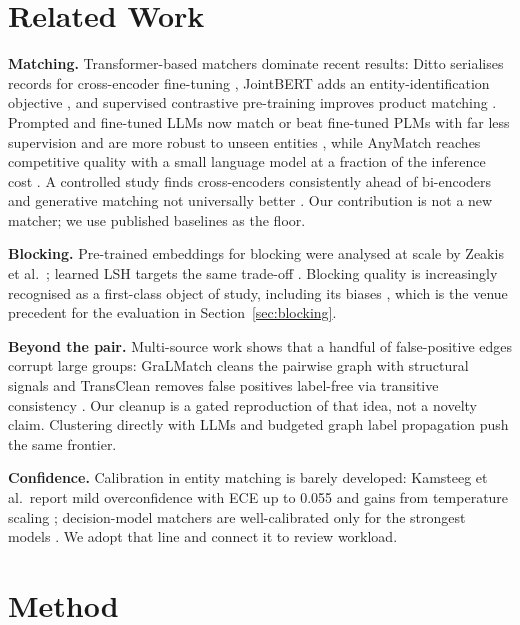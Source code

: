 \documentclass[conference]{IEEEtran}
\begin{document}
\section{Related Work}
\textbf{Matching.} Transformer-based matchers dominate recent results: Ditto serialises records for
cross-encoder fine-tuning \cite{li2020ditto}, JointBERT adds an entity-identification objective \cite{peeters2021jointbert}, and
supervised contrastive pre-training improves product matching \cite{peeters2022supcon}. Prompted and
fine-tuned LLMs now match or beat fine-tuned PLMs with far less supervision and are more robust to unseen
entities \cite{peeters2023llm,steiner2025finetune}, while AnyMatch reaches competitive quality with a
small language model at a fraction of the inference cost \cite{zhang2024anymatch}. A controlled study finds
cross-encoders consistently ahead of bi-encoders and generative matching not universally better
\cite{zhang2026beyond}. Our contribution is not a new matcher; we use published baselines as the floor.

\textbf{Blocking.} Pre-trained embeddings for blocking were analysed at scale by Zeakis et al.\
\cite{zeakis2023embeddings}; learned LSH targets the same trade-off \cite{wang2024nlsh}. Blocking quality is
increasingly recognised as a first-class object of study, including its biases \cite{moslemi2024blocking},
which is the venue precedent for the evaluation in Section~\ref{sec:blocking}.

\textbf{Beyond the pair.} Multi-source work shows that a handful of false-positive edges corrupt large
groups: GraLMatch cleans the pairwise graph with structural signals \cite{dmeer2025gralmatch} and
TransClean removes false positives label-free via transitive consistency \cite{dmeer2025transclean}. Our
cleanup is a gated reproduction of that idea, not a novelty claim. Clustering directly with LLMs
\cite{fu2026llmcer} and budgeted graph label propagation \cite{wang2026alper} push the same frontier.

\textbf{Confidence.} Calibration in entity matching is barely developed: Kamsteeg et al.\ report mild
overconfidence with ECE up to 0.055 and gains from temperature scaling \cite{kamsteeg2025calibration};
decision-model matchers are well-calibrated only for the strongest models \cite{steiner2026decision}.
We adopt that line and connect it to review workload.

\section{Method}
\label{sec:method}
\end{document}
